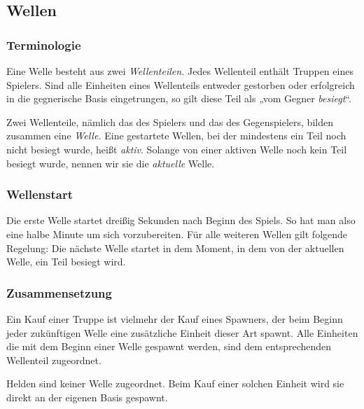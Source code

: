\subsection{Wellen}

\subsubsection{Terminologie}

Eine Welle besteht aus zwei \emph{Wellenteilen.} Jedes Wellenteil enthält
Truppen eines Spielers.  Sind alle Einheiten eines Wellenteils entweder
gestorben oder erfolgreich in die gegnerische Basis eingetrungen, so gilt diese Teil als „vom Gegner \emph{besiegt}“.

Zwei Wellenteile, nämlich das des Spielers und das des Gegenspielers, bilden
zusammen eine \emph{Welle.} Eine gestartete Wellen, bei der mindestens ein Teil
noch nicht besiegt wurde, heißt \emph{aktiv}.
Solange von einer aktiven Welle noch kein Teil besiegt wurde, nennen wir sie die \emph{aktuelle} Welle.


\subsubsection{Wellenstart}

Die erste Welle startet dreißig Sekunden nach Beginn des Spiels. So hat man also eine halbe Minute um sich vorzubereiten.
Für alle weiteren Wellen gilt folgende Regelung: Die nächste Welle startet in dem Moment, in dem von der aktuellen Welle, ein Teil besiegt wird.


\subsubsection{Zusammensetzung}

Ein Kauf einer Truppe ist vielmehr der Kauf eines Spawners, der beim Beginn
jeder zukünftigen Welle eine zusätzliche Einheit dieser Art spawnt. Alle
Einheiten die mit dem Beginn einer Welle gespawnt werden, sind dem
entsprechenden Wellenteil zugeordnet.

Helden sind keiner Welle zugeordnet. Beim Kauf einer solchen Einheit wird sie
direkt an der eigenen Basis gespawnt.
